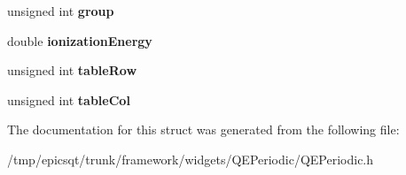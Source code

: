 \begin{DoxyCompactItemize}
\item 
\hypertarget{structQEPeriodic_1_1elementInfoStruct_aceb9865dda759f31309e6202375f0fc1}{
unsigned int {\bfseries group}}
\label{structQEPeriodic_1_1elementInfoStruct_aceb9865dda759f31309e6202375f0fc1}

\item 
\hypertarget{structQEPeriodic_1_1elementInfoStruct_a8259579d351ab4ba6b9f04820e18e9b8}{
double {\bfseries ionizationEnergy}}
\label{structQEPeriodic_1_1elementInfoStruct_a8259579d351ab4ba6b9f04820e18e9b8}

\item 
\hypertarget{structQEPeriodic_1_1elementInfoStruct_ad173c2d6d07aed9c726cca04a9851ffa}{
unsigned int {\bfseries tableRow}}
\label{structQEPeriodic_1_1elementInfoStruct_ad173c2d6d07aed9c726cca04a9851ffa}

\item 
\hypertarget{structQEPeriodic_1_1elementInfoStruct_abcfeb91b2e76b72b33dd737f232fb3bb}{
unsigned int {\bfseries tableCol}}
\label{structQEPeriodic_1_1elementInfoStruct_abcfeb91b2e76b72b33dd737f232fb3bb}

\end{DoxyCompactItemize}


The documentation for this struct was generated from the following file:\begin{DoxyCompactItemize}
\item 
/tmp/epicsqt/trunk/framework/widgets/QEPeriodic/QEPeriodic.h\end{DoxyCompactItemize}
